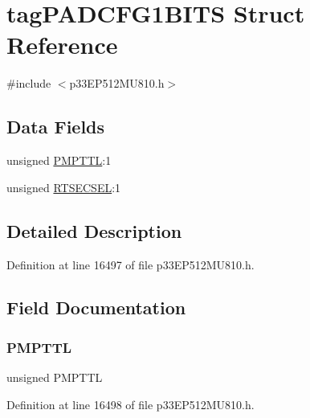 \hypertarget{structtag_p_a_d_c_f_g1_b_i_t_s}{}\section{tag\+P\+A\+D\+C\+F\+G1\+B\+I\+TS Struct Reference}
\label{structtag_p_a_d_c_f_g1_b_i_t_s}


{\ttfamily \#include $<$p33\+E\+P512\+M\+U810.\+h$>$}

\subsection*{Data Fields}
\begin{DoxyCompactItemize}
\item 
unsigned \hyperlink{structtag_p_a_d_c_f_g1_b_i_t_s_a503988cbce82dd0782d9aa68e9d296f8}{P\+M\+P\+T\+TL}\+:1
\item 
unsigned \hyperlink{structtag_p_a_d_c_f_g1_b_i_t_s_a648fd4ea0c5097e0d1336b5a68faca48}{R\+T\+S\+E\+C\+S\+EL}\+:1
\end{DoxyCompactItemize}


\subsection{Detailed Description}


Definition at line 16497 of file p33\+E\+P512\+M\+U810.\+h.



\subsection{Field Documentation}
\mbox{\label{structtag_p_a_d_c_f_g1_b_i_t_s_a503988cbce82dd0782d9aa68e9d296f8}} 
\subsubsection{\texorpdfstring{P\+M\+P\+T\+TL}{PMPTTL}}
{\footnotesize\ttfamily unsigned P\+M\+P\+T\+TL}



Definition at line 16498 of file p33\+E\+P512\+M\+U810.\+h.

\mbox{\label{structtag_p_a_d_c_f_g1_b_i_t_s_a648fd4ea0c5097e0d1336b5a68faca48}} 
